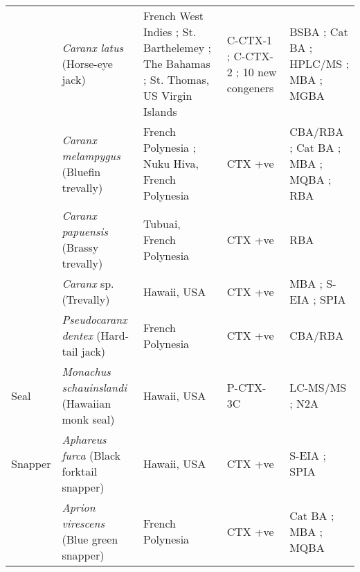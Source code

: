 \documentclass[12pt]{article}
\begin{document}
\begin{longtable}{  | p{2cm} | p{3cm} | p{4.5cm}  | p{2cm} | p{3cm}  | }
  & \emph{Caranx latus} (Horse-eye jack) & French West Indies \cite{pottier2002characterisation}; St. Barthelemey \cite{vernoux1997isolation,lewis1998structure}; The Bahamas \cite{larson1967ciguatera}; St. Thomas, US Virgin Islands \cite{granade1976ciguatera} & C-CTX-1 \cite{pottier2002characterisation,vernoux1997isolation,lewis1998structure}; C-CTX-2 \cite{vernoux1997isolation,pottier2002characterisation,lewis1998structure}; 10 new congeners \cite{pottier2002characterisation} & BSBA \cite{granade1976ciguatera}; Cat BA \cite{larson1967ciguatera}; HPLC/MS \cite{pottier2002characterisation,vernoux1997isolation,lewis1998structure}; MBA \cite{pottier2002characterisation,vernoux1997isolation} ; MGBA \cite{granade1976ciguatera}\\
  & \emph{Caranx melampygus} (Bluefin trevally) & French Polynesia \cite{bagnis1987use,chinain2014mail}; Nuku Hiva, French Polynesia \cite{darius2007ciguatera} & CTX +ve \cite{bagnis1987use,darius2007ciguatera,chinain2014mail} & CBA/RBA \cite{chinain2014mail}; Cat BA \cite{bagnis1987use}; MBA \cite{bagnis1987use}; MQBA \cite{bagnis1987use}; RBA \cite{darius2007ciguatera} \\
  &  \emph{Caranx papuensis} (Brassy trevally) & Tubuai, French Polynesia \cite{darius2007ciguatera} & CTX +ve \cite{darius2007ciguatera} & RBA \cite{darius2007ciguatera} \\
  & \emph{Caranx} sp. (Trevally)  & Hawaii, USA \cite{hokama1993evaluation,hokama1990simplified} & CTX +ve \cite{hokama1990simplified,hokama1993evaluation} & MBA \cite{hokama1993evaluation}; S-EIA \cite{hokama1993evaluation,hokama1990simplified}; SPIA \cite{hokama1990simplified,hokama1993evaluation} \\
    & \emph{Pseudocaranx dentex} (Hard-tail jack) & French Polynesia \cite{chinain2014mail} & CTX +ve \cite{chinain2014mail} & CBA/RBA \cite{chinain2014mail} \\
  \hline
 Seal & \emph{Monachus schauinslandi} (Hawaiian monk seal) & Hawaii, USA \cite{bottein2011identification} & P-CTX-3C \cite{bottein2011identification}  & LC-MS/MS \cite{bottein2011identification}; N2A \cite{bottein2011identification}  \\
 \hline
 Snapper &  \emph{Aphareus furca} (Black forktail snapper) & Hawaii, USA \cite{hokama1990simplified} & CTX +ve \cite{hokama1990simplified} & S-EIA \cite{hokama1990simplified}; SPIA \cite{hokama1990simplified}  \\
  & \emph{Aprion virescens} (Blue green snapper) & French Polynesia \cite{bagnis1987use} &  CTX +ve \cite{bagnis1987use} & Cat BA \cite{bagnis1987use}; MBA \cite{bagnis1987use}; MQBA \cite{bagnis1987use} \\

\end{longtable}
\end{document}
